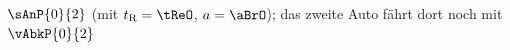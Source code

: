 $\sAnP{0}{2}$ (mit $t_\mathrm{R} = \tReO$, $a = \aBrO$); das zweite Auto fährt dort noch mit $\vAbkP{0}{2}$

